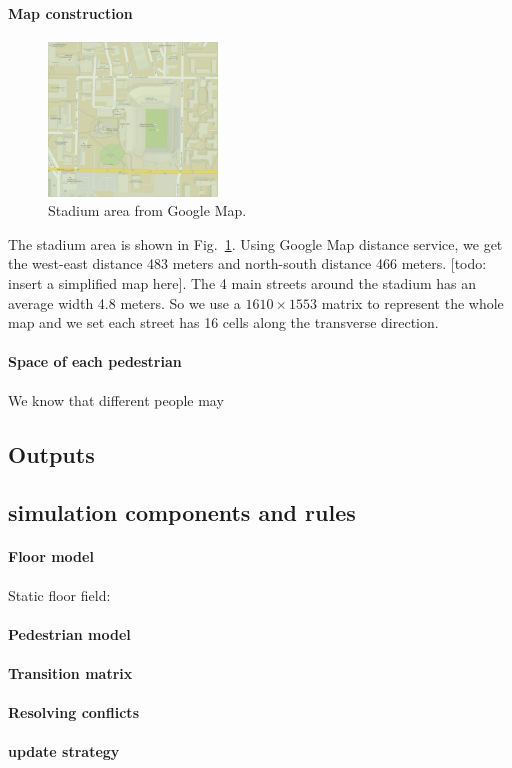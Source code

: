 \documentclass[paper=a4, fontsize=11pt]{article} %
\begin{document}
\paragraph{Map construction}

\begin{figure}[h]
  \centering
  \includegraphics[width=0.4\textwidth]{map}
  \caption{Stadium area from Google Map.}
  \label{fig:map}
\end{figure}

The stadium area is shown in Fig.~\ref{fig:map}. Using Google Map distance
service, we get the west-east distance 483 meters and north-south distance
466 meters. [todo: insert a simplified map here]. The 4 main 
streets around the stadium has an average width 4.8 meters. So we use a 
$1610\times 1553$ matrix to represent the whole map and we set each street
has 16 cells along the transverse direction.


\paragraph{Space of each pedestrian} We know that different people may

\subsection{Outputs}

\subsection{simulation components and rules}

\paragraph{Floor model}
Static floor field: 


\paragraph{Pedestrian model}

\paragraph{Transition matrix}

\paragraph{Resolving conflicts}

\paragraph{update strategy}

\end{document}
